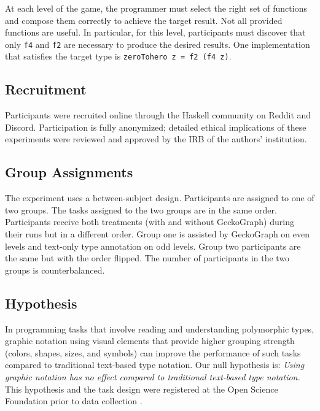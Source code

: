 \documentclass[preprint,12pt]{elsarticle}
\begin{document}
At each level of the game, the programmer must select the right set of functions and compose them correctly to achieve the target result. Not all provided functions are useful. In particular, for this level, participants must discover that only \texttt{f4} and \texttt{f2} are necessary to produce the desired results. One implementation that satisfies the target type is \texttt{zeroTohero z = f2 (f4  z)}. 


\subsection{Recruitment}
Participants were recruited online through the Haskell community on Reddit and Discord. Participation is fully anonymized; detailed ethical implications of these experiments were reviewed and approved by the IRB of the authors' institution.

\subsection{Group Assignments}

The experiment uses a between-subject design. Participants are assigned to one of two groups. The tasks assigned to the two groups are in the same order. Participants receive both treatments (with and without GeckoGraph) during their runs but in a different order.   Group one is assisted by GeckoGraph on even levels and text-only type annotation on odd levels. Group two participants are the same but with the order flipped. The number of participants in the two groups is counterbalanced.

\subsection{Hypothesis}
In programming tasks that involve reading and understanding polymorphic types, graphic notation using visual elements that provide higher grouping strength (colors, shapes, sizes, and symbols) can improve the performance of such tasks compared to traditional text-based type notation. Our null hypothesis is: {\it Using graphic notation has no effect compared to traditional text-based type notation.} This hypothesis and the task design were registered at the Open Science Foundation prior to data collection \cite{Stuckey2023-vl}. 
\end{document}
